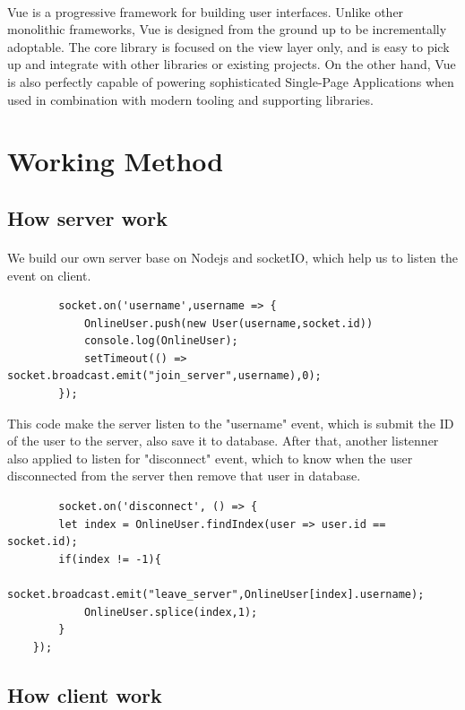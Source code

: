 \documentclass{article}
\begin{document}
\paragraph{}
Vue is a progressive framework for building user interfaces. Unlike other monolithic frameworks, Vue is designed from the ground up to be incrementally adoptable. The core library is focused on the view layer only, and is easy to pick up and integrate with other libraries or existing projects. On the other hand, Vue is also perfectly capable of powering sophisticated Single-Page Applications when used in combination with modern tooling and supporting libraries.


\section{Working Method}
\subsection{How server work}
    \paragraph{}
    We build our own server base on Nodejs and socketIO, which help us to listen the event on client.
    \begin{lstlisting}
        socket.on('username',username => {
            OnlineUser.push(new User(username,socket.id))
            console.log(OnlineUser);
            setTimeout(() => socket.broadcast.emit("join_server",username),0);
        });
    \end{lstlisting}
    This code make the server listen to the "username" event, which is submit the ID of the user to the server, also save it to database.
    \newline
    After that, another listenner also applied to listen for "disconnect" event, which to know when the user disconnected from the server then remove that user in database.
    \begin{lstlisting}
        socket.on('disconnect', () => {
        let index = OnlineUser.findIndex(user => user.id == socket.id);
        if(index != -1){
            socket.broadcast.emit("leave_server",OnlineUser[index].username);
            OnlineUser.splice(index,1);
        }
    });
    \end{lstlisting}
\subsection{How client work}
\end{document}
